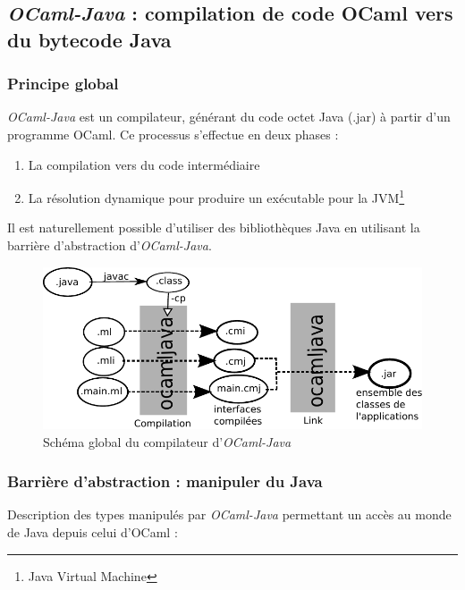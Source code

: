 \documentclass[a4paper, 11pt]{article}
\begin{document}

\subsection{\emph{OCaml-Java} : compilation de code OCaml vers du bytecode Java}

\subsubsection{Principe global}

\emph{OCaml-Java} est un compilateur, générant du code octet Java (.jar) à
partir d'un programme OCaml. Ce processus s'effectue en deux phases :
\begin{enumerate}
\item La compilation vers du code intermédiaire 
\item La résolution dynamique pour produire un exécutable pour la
  JVM\footnote{Java Virtual Machine}
\end{enumerate}
Il est naturellement possible d'utiliser des bibliothèques Java en
utilisant la barrière d'abstraction d'\emph{OCaml-Java}.

\begin{figure}[h!]
  \centering
  \includegraphics{schemaOCamlJava.pdf}
  \caption{Schéma global du compilateur d'\emph{OCaml-Java}}
\end{figure}

\newpage
\subsubsection{Barrière d'abstraction : manipuler du Java}
\noindent
Description des types manipulés par \emph{OCaml-Java} permettant un accès au
monde de Java depuis celui d'OCaml :
\end{document}
